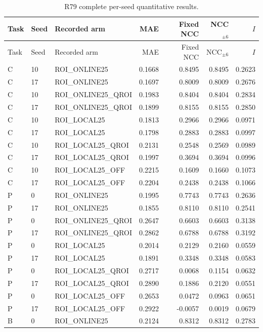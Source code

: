 \begingroup\scriptsize\setlength{\tabcolsep}{2pt}
\begin{longtable}{llp{.29\linewidth}rrrr}
\caption{R79 complete per-seed quantitative results.}\\
\hline
Task & Seed & Recorded arm & MAE & Fixed NCC & NCC$_{\pm6}$ & $I$ \\ \hline
\endfirsthead
\hline
Task & Seed & Recorded arm & MAE & Fixed NCC & NCC$_{\pm6}$ & $I$ \\ \hline
\endhead
C & 10 & ROI\_ONLINE25 & 0.1668 & 0.8495 & 0.8495 & 0.2623 \\
C & 17 & ROI\_ONLINE25 & 0.1697 & 0.8009 & 0.8009 & 0.2676 \\
C & 10 & ROI\_ONLINE25\_QROI & 0.1983 & 0.8404 & 0.8404 & 0.2834 \\
C & 17 & ROI\_ONLINE25\_QROI & 0.1899 & 0.8155 & 0.8155 & 0.2850 \\
C & 10 & ROI\_LOCAL25 & 0.1813 & 0.2966 & 0.2966 & 0.0971 \\
C & 17 & ROI\_LOCAL25 & 0.1798 & 0.2883 & 0.2883 & 0.0997 \\
C & 10 & ROI\_LOCAL25\_QROI & 0.2131 & 0.2548 & 0.2569 & 0.0989 \\
C & 17 & ROI\_LOCAL25\_QROI & 0.1997 & 0.3694 & 0.3694 & 0.0996 \\
C & 10 & ROI\_LOCAL25\_OFF & 0.2215 & 0.1609 & 0.1660 & 0.1073 \\
C & 17 & ROI\_LOCAL25\_OFF & 0.2204 & 0.2438 & 0.2438 & 0.1066 \\
P & 0 & ROI\_ONLINE25 & 0.1995 & 0.7743 & 0.7743 & 0.2636 \\
P & 17 & ROI\_ONLINE25 & 0.1855 & 0.8110 & 0.8110 & 0.2541 \\
P & 0 & ROI\_ONLINE25\_QROI & 0.2647 & 0.6603 & 0.6603 & 0.3138 \\
P & 17 & ROI\_ONLINE25\_QROI & 0.2862 & 0.6788 & 0.6788 & 0.3192 \\
P & 0 & ROI\_LOCAL25 & 0.2014 & 0.2129 & 0.2160 & 0.0559 \\
P & 17 & ROI\_LOCAL25 & 0.1891 & 0.3348 & 0.3348 & 0.0583 \\
P & 0 & ROI\_LOCAL25\_QROI & 0.2717 & 0.0068 & 0.1154 & 0.0632 \\
P & 17 & ROI\_LOCAL25\_QROI & 0.2890 & 0.1886 & 0.2120 & 0.0551 \\
P & 0 & ROI\_LOCAL25\_OFF & 0.2653 & 0.0472 & 0.0963 & 0.0651 \\
P & 17 & ROI\_LOCAL25\_OFF & 0.2922 & -0.0057 & 0.0019 & 0.0679 \\
B & 0 & ROI\_ONLINE25 & 0.2124 & 0.8312 & 0.8312 & 0.2783 \\

\end{longtable}
